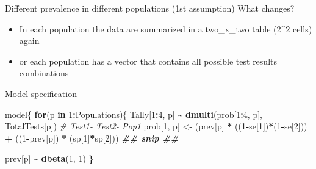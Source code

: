 \documentclass[
  ignorenonframetext,
]{beamer}
\newenvironment{Shaded}{\begin{snugshade}}{\end{snugshade}}
\newcommand{\CommentTok}[1]{\textcolor[rgb]{0.56,0.35,0.01}{\textit{#1}}}
\newcommand{\ControlFlowTok}[1]{\textcolor[rgb]{0.13,0.29,0.53}{\textbf{#1}}}
\newcommand{\DecValTok}[1]{\textcolor[rgb]{0.00,0.00,0.81}{#1}}
\newcommand{\DocumentationTok}[1]{\textcolor[rgb]{0.56,0.35,0.01}{\textbf{\textit{#1}}}}
\newcommand{\ErrorTok}[1]{\textcolor[rgb]{0.64,0.00,0.00}{\textbf{#1}}}
\newcommand{\FunctionTok}[1]{\textcolor[rgb]{0.13,0.29,0.53}{\textbf{#1}}}
\newcommand{\NormalTok}[1]{#1}
\newcommand{\OtherTok}[1]{\textcolor[rgb]{0.56,0.35,0.01}{#1}}
\newcommand{\SpecialCharTok}[1]{\textcolor[rgb]{0.81,0.36,0.00}{\textbf{#1}}}
\begin{document}
\begin{frame}
\begin{block}{Different prevalence in different populations (1st
assumption)}
\protect\hypertarget{different-prevalence-in-different-populations-1st-assumption}{}
What changes?

\begin{itemize}
\item
  In each population the data are summarized in a two\_x\_two table
  (2\^{}2 cells) again
\item
  or each population has a vector that contains all possible test
  results combinations
\end{itemize}
\end{block}
\end{frame}

\begin{frame}[fragile]
\begin{block}{Model specification}
\protect\hypertarget{model-specification}{}
\scriptsize

\begin{Shaded}
\begin{Highlighting}[]
\NormalTok{model\{}
  \ControlFlowTok{for}\NormalTok{(p }\ControlFlowTok{in} \DecValTok{1}\SpecialCharTok{:}\NormalTok{Populations)\{}
\NormalTok{    Tally[}\DecValTok{1}\SpecialCharTok{:}\DecValTok{4}\NormalTok{, p] }\SpecialCharTok{\textasciitilde{}} \FunctionTok{dmulti}\NormalTok{(prob[}\DecValTok{1}\SpecialCharTok{:}\DecValTok{4}\NormalTok{, p], TotalTests[p])}
    \CommentTok{\# Test1{-} Test2{-} Pop1}
\NormalTok{    prob[}\DecValTok{1}\NormalTok{, p] }\OtherTok{\textless{}{-}}\NormalTok{ (prev[p] }\SpecialCharTok{*}\NormalTok{ ((}\DecValTok{1}\SpecialCharTok{{-}}\NormalTok{se[}\DecValTok{1}\NormalTok{])}\SpecialCharTok{*}\NormalTok{(}\DecValTok{1}\SpecialCharTok{{-}}\NormalTok{se[}\DecValTok{2}\NormalTok{])) }\SpecialCharTok{+}\NormalTok{ ((}\DecValTok{1}\SpecialCharTok{{-}}\NormalTok{prev[p]) }\SpecialCharTok{*}\NormalTok{ (sp[}\DecValTok{1}\NormalTok{]}\SpecialCharTok{*}\NormalTok{sp[}\DecValTok{2}\NormalTok{]))}
    \DocumentationTok{\#\# snip \#\#}
      
\NormalTok{    prev[p] }\SpecialCharTok{\textasciitilde{}} \FunctionTok{dbeta}\NormalTok{(}\DecValTok{1}\NormalTok{, }\DecValTok{1}\NormalTok{)}
  \ErrorTok{\}}


\end{Highlighting}
\end{Shaded}
\end{block}
\end{frame}
\end{document}
